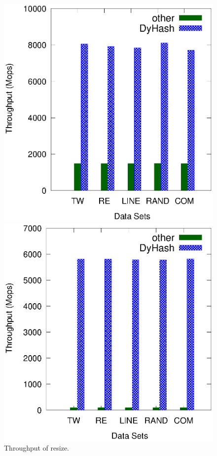 \begin{figure}[ht]
	\begin{minipage}{0.48\linewidth}\centering
		\includegraphics[width=\linewidth]{pic/compare/downsize.eps}
		\centerline{}
	\end{minipage}
	\hfill
	\begin{minipage}{0.48\linewidth}\centering
		\includegraphics[width=\linewidth]{pic/compare/upsize.eps}
		\centerline{}
	\end{minipage}
	\caption{Throughput of resize.}
	\label{fig:static}
\end{figure}


